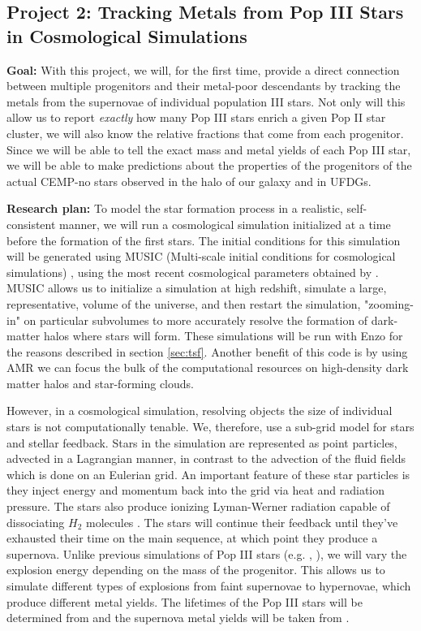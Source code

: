 \documentclass[letterpaper, 12pt]{article}
\begin{document}
\subsection*{Project 2: Tracking Metals from Pop III Stars in Cosmological Simulations}
\label{subsec:tracer_particles}

\textbf{Goal:} With this project, we will, for the first time, provide a direct connection between multiple progenitors and their metal-poor descendants by tracking the metals from the supernovae of individual population III stars. Not only will this allow us to report \textit{exactly} how many Pop III stars enrich a given Pop II star cluster, we will also know the relative fractions that come from each progenitor. Since we will be able to tell the exact mass and metal yields of each Pop III star, we will be able to make predictions about the properties of the progenitors of the actual CEMP-no stars observed in the halo of our galaxy and in UFDGs. 

\textbf{Research plan:} To model the star formation process in a realistic, self-consistent manner, we will run a cosmological simulation initialized at a time before the formation of the first stars. The initial conditions for this simulation will be generated using MUSIC (Multi-scale initial conditions for cosmological simulations) \citep{Hahn2011}, using the most recent cosmological parameters obtained by \cite{Planck2018}. MUSIC allows us to initialize a simulation at high redshift, simulate a large, representative, volume of the universe, and then restart the simulation, "zooming-in" on particular subvolumes to more accurately resolve the formation of dark-matter halos where stars will form. These simulations will be run with Enzo for the reasons described in section \ref{sec:tsf}. Another benefit of this code is by using AMR we can focus the bulk of the computational resources on high-density dark matter halos and star-forming clouds.

However, in a cosmological simulation, resolving objects the size of individual stars is not computationally tenable. We, therefore, use a sub-grid model for stars and stellar feedback. Stars in the simulation are represented as point particles, advected in a Lagrangian manner, in contrast to the advection of the fluid fields which is done on an Eulerian grid. An important feature of these star particles is they inject energy and momentum back into the grid via heat and radiation pressure. The stars also produce ionizing Lyman-Werner radiation capable of dissociating $H_2$ molecules \citep{Safranek-Shrader2012}. The stars will continue their feedback until they've exhausted their time on the main sequence, at which point they produce a supernova. Unlike previous simulations of Pop III stars (e.g. \cite{Smith2015}, \cite{Chiaki2019}), we will vary the explosion energy depending on the mass of the progenitor. This allows us to simulate different types of explosions from faint supernovae to hypernovae, which produce different metal yields. The lifetimes of the Pop III stars will be determined from \cite{Schaerer2002} and the supernova metal yields will be taken from \cite{Nomoto2006}.
\end{document}
